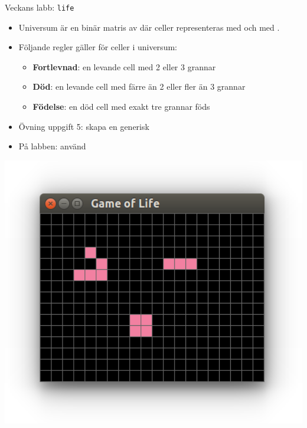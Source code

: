 


\begin{Slide}{Veckans labb: \texttt{life}}
\begin{minipage}{0.52\textwidth}
  \setlength{\leftmargini}{0pt}

\begin{itemize}
  \SlideFontSmall
\item Universum är en binär matris av  där  celler representeras med  och  med .
\item Följande regler gäller för  celler i universum:
\begin{itemize}\SlideFontTiny
  \item \textbf{Fortlevnad}: en levande cell med 2 eller 3 grannar 
  \item \textbf{Död}: en levande cell med färre än 2 eller fler än 3 grannar 
  \item \textbf{Födelse}: en död cell med exakt tre grannar föds
\end{itemize}
\item Övning  uppgift 5: skapa en generisk 
\item På labben: använd 
\end{itemize}

\end{minipage}%
\begin{minipage}{0.5\textwidth}
  \includegraphics[width=1.0\textwidth]{../img/glider-blinker-block}


\end{minipage}
\end{Slide}
